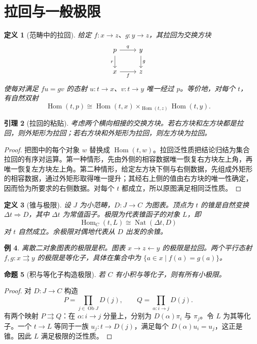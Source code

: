 \documentclass[12pt,oneside,openany,fontset=none]{ctexbook}
\theoremstyle{cn}
\newtheorem{definition}{定义}[chapter]
\newtheorem{example}[definition]{例}
\newtheorem{lemma}[definition]{引理}
\newtheorem{proposition}[definition]{命题}
\numberwithin{equation}{chapter}
\newcommand{\Hom}{\operatorname{Hom}}
\newcommand{\Nat}{\operatorname{Nat}}
\newcommand{\Ob}{\operatorname{Ob}}
\begin{document}
\section{拉回与一般极限}
\begin{definition}[范畴中的拉回]
给定 $f:x\to z$、$g:y\to z$，其拉回为交换方块
\[
\begin{tikzcd}
p\ar[r,"q"]\ar[d,"r"']&y\ar[d,"g"]\\
x\ar[r,"f"']&z
\end{tikzcd}
\]
使每对满足 $fu=gv$ 的态射 $u:t\to x$、$v:t\to y$ 唯一经过 $p$。等价地，对每个 $t$，有自然双射
\[
\Hom(t,p)\cong\Hom(t,x)\times_{\Hom(t,z)}\Hom(t,y).
\]
\end{definition}
\begin{lemma}[拉回的粘贴]
考虑两个横向相接的交换方块。若右方块和左方块都是拉回，则外矩形为拉回；若右方块和外矩形为拉回，则左方块为拉回。
\end{lemma}
\begin{proof}
把图中的每个对象 $w$ 替换成 $\Hom(t,w)$。拉回泛性质把结论归结为集合拉回的有序对运算。第一种情形，先由外侧的相容数据唯一恢复右方块左上角，再唯一恢复左方块左上角。第二种情形，给定左方块下侧与右侧数据，先组成外矩形的相容数据，通过外矩形取得唯一提升；其经右上侧的值由右方块的唯一性确定，因而恰为所要求的右侧数据。对每个 $t$ 都成立，所以原图满足相同泛性质。
\end{proof}
\begin{definition}[锥与极限]
设 $J$ 为小范畴，$D:J\to C$ 为图表。顶点为 $t$ 的锥是自然变换 $\Delta t\Rightarrow D$，其中 $\Delta t$ 为常值函子。极限为代表锥函子的对象 $L$，即
\[
\Hom_C(t,L)\cong\Nat(\Delta t,D)
\]
对 $t$ 自然成立。余极限对偶地代表从 $D$ 出发的余锥。
\end{definition}
\begin{example}
离散二对象图表的极限是积。图表 $x\to z\leftarrow y$ 的极限是拉回。两个平行态射 $f,g:x\rightrightarrows y$ 的极限是等化子，具体在集合中为 $\{a\in x\mid f(a)=g(a)\}$。
\end{example}
\begin{proposition}[积与等化子构造极限]
若 $C$ 有小积与等化子，则有所有小极限。
\end{proposition}
\begin{proof}
对 $D:J\to C$ 构造
\[
P=\prod_{j\in\Ob J}D(j),
\qquad Q=\prod_{\alpha:i\to j}D(j).
\]
有两个映射 $P\rightrightarrows Q$：在 $\alpha:i\to j$ 分量上，分别为 $D(\alpha)\pi_i$ 与 $\pi_j$。令 $L$ 为其等化子。一个 $t\to L$ 等同于一族 $u_j:t\to D(j)$，满足每个 $D(\alpha)u_i=u_j$，这正是锥。因此 $L$ 满足极限的泛性质。
\end{proof}
\end{document}
